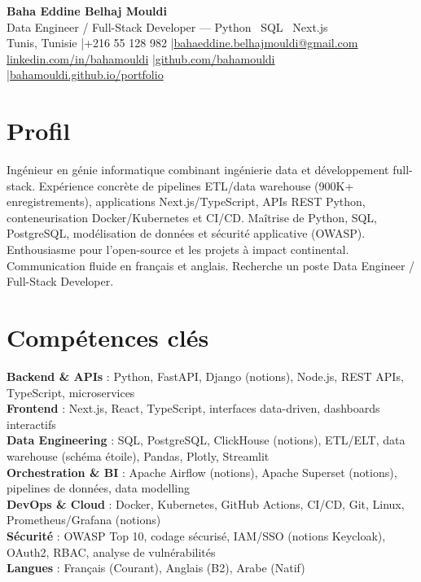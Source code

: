 \documentclass[a4paper,10pt]{article}
\begin{document}
\begin{center}
{\LARGE\bfseries\color{navy} Baha Eddine Belhaj Mouldi}\\[3pt]
{\large Data Engineer / Full-Stack Developer --- Python \textbar\ SQL \textbar\ Next.js}\\[5pt]
Tunis, Tunisie \quad|\quad +216 55 128 982 \quad|\quad \href{mailto:bahaeddine.belhajmouldi@gmail.com}{bahaeddine.belhajmouldi@gmail.com}\\[1pt]
\href{https://www.linkedin.com/in/bahamouldi}{linkedin.com/in/bahamouldi} \quad|\quad \href{https://github.com/bahamouldi}{github.com/bahamouldi} \quad|\quad \href{https://bahamouldi.github.io/portfolio/}{bahamouldi.github.io/portfolio}
\end{center}
\vspace{1pt}
\section{Profil}
Ingénieur en génie informatique combinant ingénierie data et développement full-stack. Expérience concrète de pipelines ETL/data warehouse (900K+ enregistrements), applications Next.js/TypeScript, APIs REST Python, conteneurisation Docker/Kubernetes et CI/CD. Maîtrise de Python, SQL, PostgreSQL, modélisation de données et sécurité applicative (OWASP). Enthousiasme pour l'open-source et les projets à impact continental. Communication fluide en français et anglais. Recherche un poste Data Engineer / Full-Stack Developer.
\section{Compétences clés}
\textbf{Backend \& APIs} : Python, FastAPI, Django (notions), Node.js, REST APIs, TypeScript, microservices\\[0.5pt]
\textbf{Frontend} : Next.js, React, TypeScript, interfaces data-driven, dashboards interactifs\\[0.5pt]
\textbf{Data Engineering} : SQL, PostgreSQL, ClickHouse (notions), ETL/ELT, data warehouse (schéma étoile), Pandas, Plotly, Streamlit\\[0.5pt]
\textbf{Orchestration \& BI} : Apache Airflow (notions), Apache Superset (notions), pipelines de données, data modelling\\[0.5pt]
\textbf{DevOps \& Cloud} : Docker, Kubernetes, GitHub Actions, CI/CD, Git, Linux, Prometheus/Grafana (notions)\\[0.5pt]
\textbf{Sécurité} : OWASP Top 10, codage sécurisé, IAM/SSO (notions Keycloak), OAuth2, RBAC, analyse de vulnérabilités\\[0.5pt]
\textbf{Langues} : Français (Courant), Anglais (B2), Arabe (Natif)
\end{document}
